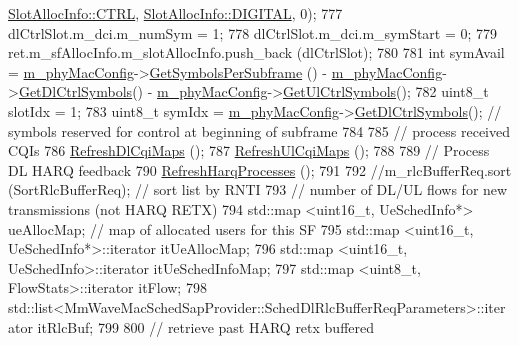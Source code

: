 \begin{DoxyCode}
      \hyperlink{structns3_1_1SlotAllocInfo_a3ea7cb503bfd0c9a4df55a71b81b9331ad78b7d76ef82d56c33be1fa9c1867409}{SlotAllocInfo::CTRL}, \hyperlink{structns3_1_1SlotAllocInfo_adcbd067d82be6260b3399167d8f0b4eca47a67c342db658a08ded9ce4b49417ea}{SlotAllocInfo::DIGITAL}, 0);
777         dlCtrlSlot.m\_dci.m\_numSym = 1;
778         dlCtrlSlot.m\_dci.m\_symStart = 0;
779         ret.m\_sfAllocInfo.m\_slotAllocInfo.push\_back (dlCtrlSlot);
780 
781         \textcolor{keywordtype}{int} symAvail = \hyperlink{classns3_1_1MmWaveMacScheduler_a24d7af4971d2e500fe543cefbafa2fd9}{m\_phyMacConfig}->\hyperlink{classns3_1_1MmWavePhyMacCommon_a2fe835b76e3c689defa413e395cd10cb}{GetSymbolsPerSubframe} () - 
      \hyperlink{classns3_1_1MmWaveMacScheduler_a24d7af4971d2e500fe543cefbafa2fd9}{m\_phyMacConfig}->\hyperlink{classns3_1_1MmWavePhyMacCommon_a1be2da684374de93d7f501aab2441b5a}{GetDlCtrlSymbols}() - 
      \hyperlink{classns3_1_1MmWaveMacScheduler_a24d7af4971d2e500fe543cefbafa2fd9}{m\_phyMacConfig}->\hyperlink{classns3_1_1MmWavePhyMacCommon_aa0bf8af14050bc5dc6513fbc86319a9b}{GetUlCtrlSymbols}();
782         uint8\_t slotIdx = 1;
783         uint8\_t symIdx = \hyperlink{classns3_1_1MmWaveMacScheduler_a24d7af4971d2e500fe543cefbafa2fd9}{m\_phyMacConfig}->\hyperlink{classns3_1_1MmWavePhyMacCommon_a1be2da684374de93d7f501aab2441b5a}{GetDlCtrlSymbols}(); \textcolor{comment}{// symbols
       reserved for control at beginning of subframe}
784 
785         \textcolor{comment}{// process received CQIs}
786         \hyperlink{classns3_1_1MmWaveFlexTtiMaxWeightMacScheduler_a11fa932028c47348c6c0ec88fcdab0fd}{RefreshDlCqiMaps} ();
787         \hyperlink{classns3_1_1MmWaveFlexTtiMaxWeightMacScheduler_a01931ad90307741598274c09b467ecef}{RefreshUlCqiMaps} ();
788 
789         \textcolor{comment}{// Process DL HARQ feedback}
790         \hyperlink{classns3_1_1MmWaveFlexTtiMaxWeightMacScheduler_a602bb8621045102ce91b417d975278b7}{RefreshHarqProcesses} ();
791 
792         \textcolor{comment}{//m\_rlcBufferReq.sort (SortRlcBufferReq);       // sort list by RNTI}
793         \textcolor{comment}{// number of DL/UL flows for new transmissions (not HARQ RETX)}
794         std::map <uint16\_t, UeSchedInfo*> ueAllocMap;           \textcolor{comment}{// map of allocated users for this SF}
795         std::map <uint16\_t, UeSchedInfo*>::iterator itUeAllocMap;
796         std::map <uint16\_t, UeSchedInfo>::iterator itUeSchedInfoMap;
797         std::map <uint8\_t, FlowStats>::iterator itFlow;
798         std::list<MmWaveMacSchedSapProvider::SchedDlRlcBufferReqParameters>::iterator itRlcBuf;
799 
800         \textcolor{comment}{// retrieve past HARQ retx buffered}

\end{DoxyCode}
